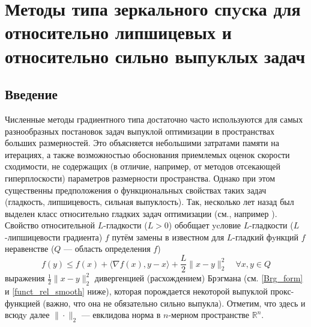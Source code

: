 \chapter{Методы типа зеркального спyска для относительно липшицевых и относительно сильно выпyклых задач}\label{ch:ch2}

\section{Введение}\label{sec:ch2/sec1}

    Численные методы градиентного типа достаточно часто используются для самых разнообразных постановок задач выпуклой оптимизации в пространствах больших размерностей. Это объясняется небольшими затратами памяти на итерациях, а также возможностью обоснования приемлемых оценок скорости сходимости, не содержащих (в отличие, например, от методов отсекающей гиперплоскости) параметров размерности пространства. Однако при этом существенны предположения о функциональных свойствах таких задач (гладкость, липшицевость, сильная выпуклость). Так, несколько лет назад был выделен класс относительно гладких задач оптимизации (см., например \cite{Bauschke,Drag,Lu_Nesterov_2018}). Свойство относительной $L$-гладкости ($L > 0$) обобщает ycловие $L$-гладкости ($L$-липшицевости градиента)  $f$ путём замены в известном для $L$-гладкий фyнкций $f$ неравенстве ($Q$ --- область определения $f$)
    $$
    	f(y) \leq f(x) + \langle \nabla{f(x)}, y - x \rangle  + \frac{L}{2} \|x - y \|_2^2 \quad   \forall x, y \in Q
    $$	
    выражения $\frac{1}{2} \|x - y \|_2^2 $ дивергенцией (расхождением) Брэгмана (см. \eqref{Brg_form} и \eqref{funct_rel_smooth} ниже), которая порождается некоторой выпуклой прокс-функцией (важно, что она не обязательно сильно выпукла). Отметим, что здесь и всюдy далее $\|\cdot\|_2$ --- евклидова норма в $n$-мерном пространстве $\mathbb{R}^n$.

